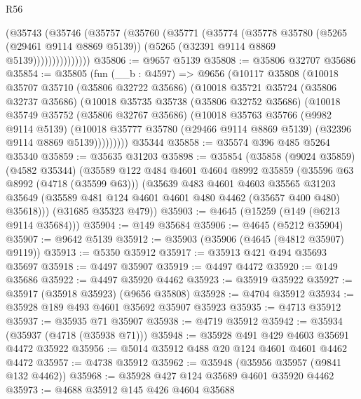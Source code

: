 \begin{lexlean}{R56}
\begin{coremodule}
                (@35743
                  (@35746
                    (@35757
                      (@35760
                        (@35771
                          (@35774
                            (@35778
                              @35780
                              (@5265 (@29461 @9114 @8869 @5139))
                              (@5265 (@32391 @9114 @8869 @5139)))))))))))))))
@35806 := @9657 @5139
@35808 := @35806 @32707 @35686
@35854 := @35805
    (fun (__b : @4597) =>
    @9656
      (@10117
        @35808
        (@10018
          @35707
          @35710
          (@35806 @32722 @35686)
          (@10018
            @35721
            @35724
            (@35806 @32737 @35686)
            (@10018
              @35735
              @35738
              (@35806 @32752 @35686)
              (@10018
                @35749
                @35752
                (@35806 @32767 @35686)
                (@10018
                  @35763
                  @35766
                  (@9982 @9114 @5139)
                  (@10018
                    @35777
                    @35780
                    (@29466 @9114 @8869 @5139)
                    (@32396 @9114 @8869 @5139)))))))))
    @35344
@35858 := @35574 @396 @485 @5264 @35340
@35859 := @35635 @31203
@35898 := @35854
    (@35858
      (@9024 @35859)
      (@4582 @35344)
      (@35589
        @122
        @484
        @4601
        @4604
        @8992
        @35859
        (@35596 @63 @8992 (@4718 (@35599 @63)))
        (@35639
          @483
          @4601
          @4603
          @35565
          @31203
          @35649
          (@35589 @481 @124 @4601 @4601 @480 @4462 (@35657 @400 @480) @35618)))
      (@31685 @35323 @479))
@35903 := @4645 (@15259 (@149 (@6213 @9114 @35684)))
@35904 := @149 @35684
@35906 := @4645 (@5212 @35904)
@35907 := @9642 @5139
@35912 := @35903 (@35906 (@4645 (@4812 @35907) @9119))
@35913 := @5350 @35912
@35917 := @35913 @421 @494 @35693 @35697
@35918 := @4497 @35907
@35919 := @4497 @4472
@35920 := @149 @35686
@35922 := @4497 @35920 @4462
@35923 := @35919 @35922
@35927 := @35917 (@35918 @35923) (@9656 @35808)
@35928 := @4704 @35912
@35934 := @35928 @189 @493 @4601 @35692 @35907 @35923
@35935 := @4713 @35912
@35937 := @35935 @71 @35907
@35938 := @4719 @35912
@35942 := @35934 (@35937 (@4718 (@35938 @71)))
@35948 := @35928 @491 @429 @4603 @35691 @4472 @35922
@35956 := @5014 @35912 @488 @20 @124 @4601 @4601 @4462 @4472
@35957 := @4738 @35912
@35962 := @35948 (@35956 @35957 (@9841 @132 @4462))
@35968 := @35928 @427 @124 @35689 @4601 @35920 @4462
@35973 := @4688 @35912 @145 @426 @4604 @35688

\end{coremodule}
\end{lexlean}
